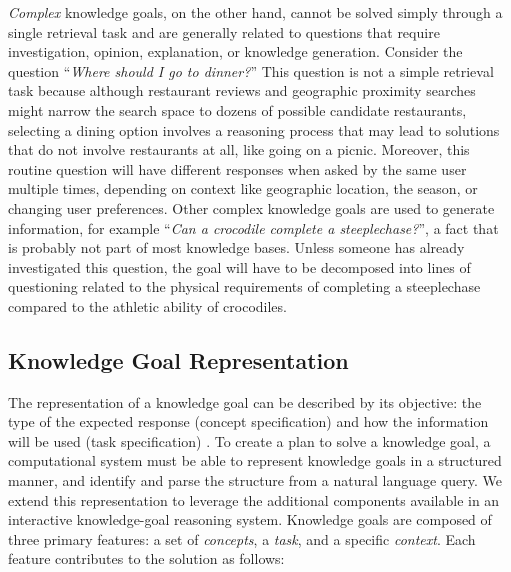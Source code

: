\documentclass[11pt,letterpaper]{article}
\begin{document}
\textit{Complex} knowledge goals, on the other hand, cannot be solved simply through a single retrieval task and are generally related to questions that require investigation, opinion, explanation, or knowledge generation. Consider the question ``\textit{Where should I go to dinner?}'' This question is not a simple retrieval task because although restaurant reviews and geographic proximity searches might narrow the search space to dozens of possible candidate restaurants, selecting a dining option involves a reasoning process that may lead to solutions that do not involve restaurants at all, like going on a picnic. Moreover, this routine question will have different responses when asked by the same user multiple times, depending on context like geographic location, the season, or changing user preferences. Other complex knowledge goals are used to generate information, for example ``\textit{Can a crocodile complete a steeplechase?}'', a fact that is probably not part of most knowledge bases. Unless someone has already investigated this question, the goal will have to be decomposed into lines of questioning related to the physical requirements of completing a steeplechase compared to the athletic ability of crocodiles.


\subsection{Knowledge Goal Representation}

The representation of a knowledge goal can be described by its objective: the type of the expected response (concept specification) and how the information will be used (task specification) \cite{ram_theory_1991}. To create a plan to solve a knowledge goal, a computational system must be able to represent knowledge goals in a structured manner, and identify and parse the structure from a natural language query. We extend this representation to leverage the additional components available in an interactive knowledge-goal reasoning system. Knowledge goals are composed of three primary features: a set of \textit{concepts}, a \textit{task}, and a specific \textit{context}. Each feature contributes to the solution as follows:
\end{document}
